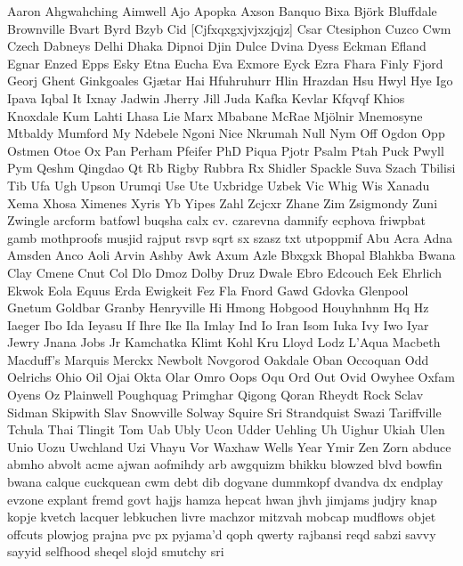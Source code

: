 \documentclass[a4paper,14pt]{memoir}
\begin{document}
{Aaron Ahgwahching Aimwell Ajo Apopka Axson Banquo Bixa Björk Bluffdale Brownville Bvart Byrd Bzyb Cid [Cjfxqxgxjvjxzjqjz] Csar Ctesiphon Cuzco Cwm Czech Dabneys Delhi Dhaka Dipnoi Djin Dulce Dvina Dyess Eckman Efland Egnar Enzed Epps Esky Etna Eucha Eva Exmore Eyck Ezra Fhara Finly Fjord Georj Ghent Ginkgoales Gjætar Hai Hfuhruhurr Hlin Hrazdan Hsu Hwyl Hye Igo Ipava Iqbal It Ixnay Jadwin Jherry Jill Juda Kafka Kevlar Kfqvqf Khios Knoxdale Kum Lahti Lhasa Lie Marx Mbabane McRae Mjölnir Mnemosyne Mtbaldy Mumford My Ndebele Ngoni Nice Nkrumah Null Nym Off Ogdon Opp Ostmen Otoe Ox Pan Perham Pfeifer PhD Piqua Pjotr Psalm Ptah Puck Pwyll Pym Qeshm Qingdao Qt Rb Rigby Rubbra Rx Shidler Spackle Suva Szach Tbilisi Tib Ufa Ugh Upson Urumqi Use Ute Uxbridge Uzbek Vic Whig Wis Xanadu Xema Xhosa Ximenes Xyris Yb Yipes Zahl Zcjcxr Zhane Zim Zsigmondy Zuni Zwingle arcform batfowl buqsha calx cv. czarevna damnify ecphova friwpbat gamb mothproofs musjid rajput rsvp sqrt sx szasz txt utpoppmif
Abu Acra Adna Amsden Anco Aoli Arvin Ashby Awk Axum Azle Bbxgxk Bhopal Blahkba Bwana Clay Cmene Cnut Col Dlo Dmoz Dolby Druz Dwale Ebro Edcouch Eek Ehrlich Ekwok Eola Equus Erda Ewigkeit Fez Fla Fnord Gawd Gdovka Glenpool Gnetum Goldbar Granby Henryville Hi Hmong Hobgood Houyhnhnm Hq Hz Iaeger Ibo Ida Ieyasu If Ihre Ike Ila Imlay Ind Io Iran Isom Iuka Ivy Iwo Iyar Jewry Jnana Jobs Jr Kamchatka Klimt Kohl Kru Lloyd Lodz L’Aqua Macbeth Macduff’s Marquis Merckx Newbolt Novgorod Oakdale Oban Occoquan Odd Oelrichs Ohio Oil Ojai Okta Olar Omro Oops Oqu Ord Out Ovid Owyhee Oxfam Oyens Oz Plainwell Poughquag Primghar Qigong Qoran Rheydt Rock Sclav Sidman Skipwith Slav Snowville Solway Squire Sri Strandquist Swazi Tariffville Tchula Thai Tlingit Tom Uab Ubly Ucon Udder Uehling Uh Uighur Ukiah Ulen Unio Uozu Uwchland Uzi Vhayu Vor Waxhaw Wells Year Ymir Zen Zorn abduce abmho abvolt acme ajwan aofmihdy arb awgquizm bhikku blowzed blvd bowfin bwana calque cuckquean cwm debt dib dogvane dummkopf dvandva dx endplay evzone explant fremd govt hajjs hamza hepcat hwan jhvh jimjams judjry knap kopje kvetch lacquer lebkuchen livre machzor mitzvah mobcap mudflows objet offcuts plowjog prajna pvc px pyjama’d qoph qwerty rajbansi reqd sabzi savvy sayyid selfhood sheqel slojd smutchy sri
}
\end{document}
